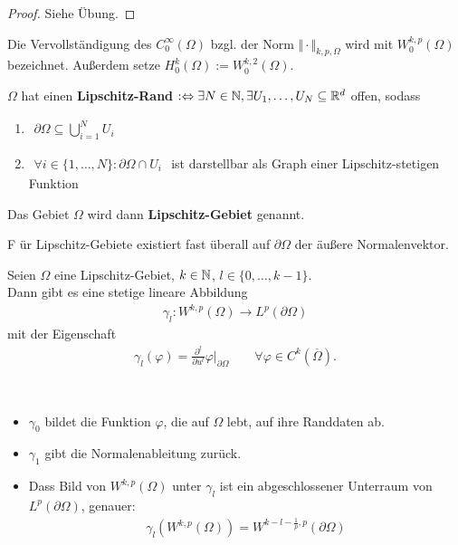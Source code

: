 \begin{proof}
	Siehe Übung.
\end{proof}

\begin{definition}
	Die Vervollständigung des $C_0^\infty(\Omega)$ bzgl. der Norm $\Vert\cdot\Vert_{k,p,\Omega}$ wird mit $W_0^{k,p}(\Omega)$ bezeichnet. 
	Außerdem setze $H_0^k(\Omega):=W_0^{k,2}(\Omega)$.
\end{definition}

\begin{definition}\enter
	$\Omega$ hat einen \textbf{Lipschitz-Rand} $:\Leftrightarrow\exists N\in\mathbb{N},\exists U_1,\ldots,U_N\subseteq\mathbb{R}^d$ offen, sodass
	\begin{enumerate}
		\item $\begin{aligned}
			\partial\Omega\subseteq\bigcup\limits^N_{i=1} U_i
		\end{aligned}$
		\item $\begin{aligned}
			\forall i\in\lbrace1,\ldots,N\rbrace:\partial\Omega\cap U_i
		\end{aligned}$
		ist darstellbar als Graph einer Lipschitz-stetigen Funktion
	\end{enumerate}
	Das Gebiet $\Omega$ wird dann \textbf{Lipschitz-Gebiet} genannt.
\end{definition}

\begin{bemerkung}
F	ür Lipschitz-Gebiete existiert fast überall auf $\partial\Omega$ der äußere Normalenvektor.
\end{bemerkung}

\begin{satz}[Spursatz]\label{satz1.7Spursatz}\enter
	Seien $\Omega$ eine Lipschitz-Gebiet, $k\in\mathbb{N}$, $l\in\lbrace 0,\ldots,k-1\rbrace$.\\
	Dann gibt es eine stetige lineare Abbildung
	\begin{align*}
		\gamma_l:W^{k,p}(\Omega)\rightarrow L^p(\partial\Omega)
	\end{align*}
	mit der Eigenschaft
	\begin{align*}
		\gamma_l(\varphi)=\frac{\partial^l}{\partial u^l}\varphi|_{\partial\Omega}\qquad\forall\varphi\in C^k(\overline{\Omega}).
	\end{align*}
\end{satz}

\begin{bemerkung}\
	\begin{itemize}
		\item $\gamma_0$ bildet die Funktion $\varphi$, die auf $\Omega$ lebt, auf ihre Randdaten ab.
		\item  $\gamma_1$ gibt die Normalenableitung zurück.
		\item Dass Bild von $W^{k,p}(\Omega)$ unter $\gamma_l$ ist ein abgeschlossener Unterraum von $L^p(\partial\Omega)$, genauer:
		\begin{align*}
			\gamma_l\left(W^{k,p}(\Omega)\right)=W^{k-l-\frac{1}{p},p}(\partial\Omega)
		\end{align*}
	\end{itemize}
\end{bemerkung}

